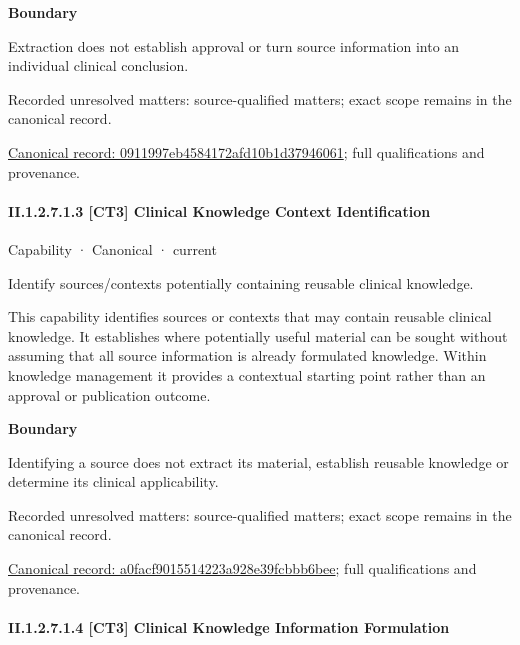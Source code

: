 \textbf{Boundary}



Extraction does not establish approval or turn source information into an individual clinical conclusion.


{\small Recorded unresolved matters: source-qualified matters; exact scope remains in the canonical record.}\par
{\footnotesize \href{../../../../../../../continuum/strategy/capability/0911997eb4584172afd10b1d37946061.md}{Canonical record: 0911997eb4584172afd10b1d37946061}; full qualifications and provenance.}\par
\paragraph*{II.1.2.7.1.3 [CT3] Clinical Knowledge Context Identification}
\label{navigation:II.1.2.7.1.3}

\label{element:a0facf9015514223a928e39fcbbb6bee}
{\small Capability · Canonical · current}\par

Identify sources/contexts potentially containing reusable clinical knowledge.



This capability identifies sources or contexts that may contain reusable clinical knowledge. It establishes where potentially useful material can be sought without assuming that all source information is already formulated knowledge. Within knowledge management it provides a contextual starting point rather than an approval or publication outcome.



\textbf{Boundary}



Identifying a source does not extract its material, establish reusable knowledge or determine its clinical applicability.


{\small Recorded unresolved matters: source-qualified matters; exact scope remains in the canonical record.}\par
{\footnotesize \href{../../../../../../../continuum/strategy/capability/a0facf9015514223a928e39fcbbb6bee.md}{Canonical record: a0facf9015514223a928e39fcbbb6bee}; full qualifications and provenance.}\par
\paragraph*{II.1.2.7.1.4 [CT3] Clinical Knowledge Information Formulation}
\label{navigation:II.1.2.7.1.4}

